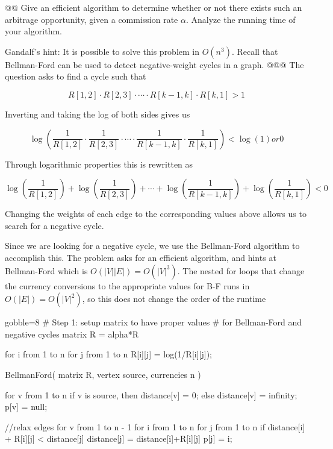 \documentclass[10pt]{article}\usepackage[]{graphicx}\usepackage[]{xcolor}
\begin{document}
\begin{easylist}[enumerate]
    @@ Give an efficient algorithm to determine whether or not there exists such an arbitrage
    opportunity, given a commission rate $\alpha$. Analyze the running time of your algorithm.

    Gandalf's hint: It is possible to solve this problem in $O(n^3)$. Recall that Bellman-Ford can be used to detect
    negative-weight cycles in a graph.
    @@@ The question asks to find a cycle such that

    \[
        R[1,2] \cdot R[2,3] \cdot \cdots \cdot R[k-1, k] \cdot R[k,1] > 1
    \]

    Inverting and taking the log of both sides gives us

    \[
        \log\left(\frac{1}{R[1,2]} \cdot \frac{1}{R[2,3]} \cdot \cdots
            \cdot \frac{1}{R[k-1, k]} \cdot \frac{1}{R[k,1]}\right) < \log(1) or 0
    \]

    Through logarithmic properties this is rewritten as

    \[
        \log\left(\frac{1}{R[1,2]}\right) +
            \log\left(\frac{1}{R[2,3]}\right) +
            \cdots + \log\left(\frac{1}{R[k-1,k]}\right) +
            \log\left(\frac{1}{R[k,1]}\right) < 0
    \]

    Changing the weights of each edge to the corresponding values above allows us to search for a negative cycle.

    Since we are looking for a negative cycle, we use the Bellman-Ford algorithm to accomplish this.  The problem asks
    for an efficient algorithm, and hints at Bellman-Ford which is $O(|V||E|) = O(|V|^3)$.  The nested for loops that
    change the currency conversions to the appropriate values for B-F runs in $O(|E|) = O(|V|^2)$, so this does not
    change the order of the runtime

    \begin{pythoncode*}{gobble=8}
        # Step 1: setup matrix to have proper values
        #         for Bellman-Ford and negative cycles
        matrix R = alpha*R

        for i from 1 to n {
          for j from 1 to n {
            R[i][j] = log(1/R[i][j]);
          }
        }

        BellmanFord( matrix R, vertex source, currencies n ){
          for v from 1 to n{
            if v is source, then distance[v] = 0;
            else distance[v] = infinity;
            p[v] = null;
          }

          //relax edges
          for v from 1 to n - 1{
            for i from 1 to n{
              for j from 1 to n{
                if distance[i] + R[i][j] < distance[j]
                  distance[j] = distance[i]+R[i][j]
                  p[j] = i;
              }
            }
          }

}
\end{pythoncode*}
\end{easylist}
\end{document}
